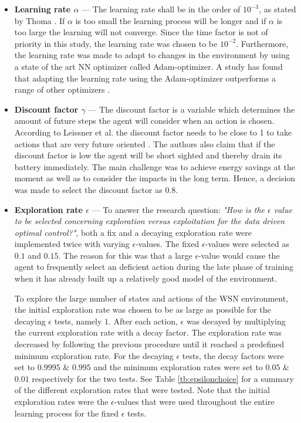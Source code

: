 \begin{itemize}
    \item \textbf{Learning rate $\alpha$} --- The learning rate shall be in the order of $10^{-3}$, as stated by Thoma \cite{Thoma2017}. If $\alpha$ is too small the learning process will be longer and if $\alpha$ is too large the learning will not converge. Since the time factor is not of priority in this study, the learning rate was chosen to be $10^{-2}$. \newline
    \newline
    \noindent Furthermore, the learning rate was made to adapt to changes in the environment by using a state of the art NN optimizer called Adam-optimizer. A study has found that adapting the learning rate using the Adam-optimizer outperforms a range of other optimizers \cite{kingma2014adam}.

    \item \textbf{Discount factor $\gamma$} --- The discount factor is a variable which determines the amount of future steps the agent will consider when an action is chosen. According to Leissner et al. the discount factor needs to be close to 1 to take actions that are very future oriented \cite{Liessner2019}. The authors also claim that if the discount factor is low the agent will be short sighted and thereby drain its battery immediately. The main challenge was to achieve energy savings at the moment as well as to consider the impacts in the long term. Hence, a decision was made to select the discount factor as $0.8$. 
    
    \item \textbf{Exploration rate $\epsilon$} --- To answer the research question: \textit{"How is the $\epsilon$ value to be selected concerning exploration versus exploitation for the data driven optimal control?"}, both a fix and a decaying exploration rate were implemented twice with varying $\epsilon$-values. The fixed $\epsilon$-values were selected as $0.1$ and $0.15$. The reason for this was that a large $\epsilon$-value would cause the agent to frequently select an deficient action during the late phase of training when it has already built up a relatively good model of the environment. \newline  
    
    \noindent To explore the large number of states and actions of the WSN environment, the initial exploration rate was chosen to be as large as possible for the decaying $\epsilon$ tests, namely $1$. After each action, $\epsilon$ was decayed by multiplying the current exploration rate with a decay factor. The exploration rate was decreased by following the previous procedure until it reached a predefined minimum exploration rate. For the decaying $\epsilon$ tests, the decay factors were set to $0.9995$ \& $0.995$ and the minimum exploration rates were set to $0.05$ \& $0.01$ respectively for the two tests. See Table \ref{tb:epsilonchoice} for a summary of the different exploration rates that were tested. Note that the initial exploration rates were the $\epsilon$-values that were used throughout the entire learning process for the fixed $\epsilon$ tests.
        

\end{itemize}
